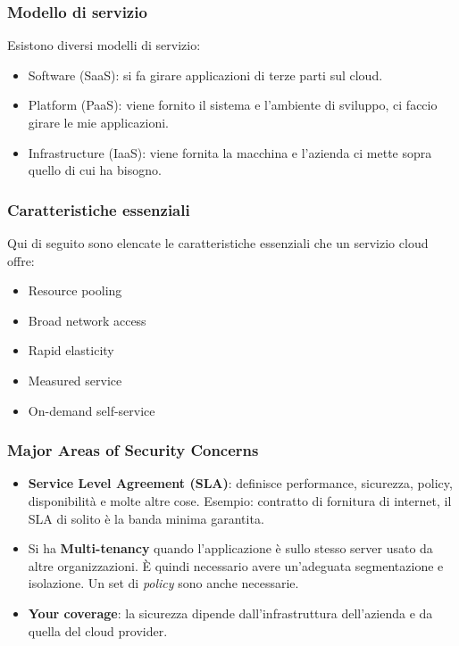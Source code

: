\subsubsection{Modello di servizio}

Esistono diversi modelli di servizio:
\begin{itemize}
  \item Software (SaaS): si fa girare applicazioni di terze parti sul cloud.
  \item Platform (PaaS): viene fornito il sistema e l'ambiente di sviluppo, ci 
  faccio girare le mie applicazioni. 
  \item Infrastructure (IaaS): viene fornita la macchina e l'azienda ci mette 
  sopra quello di cui ha bisogno.
  
\end{itemize}

\subsubsection{Caratteristiche essenziali}

Qui di seguito sono elencate le caratteristiche essenziali che un servizio 
cloud offre:
\begin{itemize}
  \item Resource pooling
  \item Broad network access
  \item Rapid elasticity
  \item Measured service
  \item On-demand self-service
\end{itemize}

\subsubsection{Major Areas of Security Concerns}

\begin{itemize}
 \item \textbf{Service Level Agreement (SLA)}: definisce performance, 
sicurezza, policy, disponibilità e molte altre cose. Esempio: contratto di 
fornitura di internet, il SLA di solito è la banda minima garantita.

 \item Si ha \textbf{Multi-tenancy} quando l'applicazione è sullo stesso server 
usato da altre organizzazioni. È quindi necessario avere un'adeguata 
segmentazione e isolazione. Un set di \textit{policy} sono anche necessarie.

 \item \textbf{Your coverage}: la sicurezza dipende dall'infrastruttura 
dell'azienda e da quella del cloud provider.
\end{itemize}

